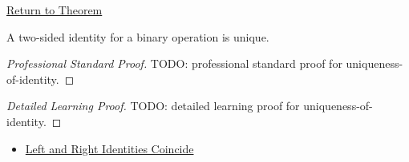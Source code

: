 \newpage
{}
\label{prf:uniqueness-of-identity}

\begin{remark*}[Return]
\hyperref[thm:uniqueness-of-identity]{Return to Theorem}
\end{remark*}

\begin{theorem*}
A two-sided identity for a binary operation is unique.
\end{theorem*}

\begin{proof}[Professional Standard Proof]
\LRAProofBodyStart
TODO: professional standard proof for uniqueness-of-identity.
\end{proof}

\begin{proof}[Detailed Learning Proof]
\LRAProofBodyStart
TODO: detailed learning proof for uniqueness-of-identity.
\end{proof}

\begin{remark*}
\end{remark*}

\begin{dependencies}
\begin{itemize}
  \item \hyperref[lem:left-right-identities-coincide]{Left and Right Identities Coincide}
\end{itemize}
\end{dependencies}

\clearpage
